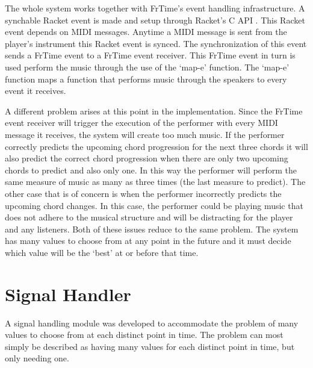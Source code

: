 \documentclass[12pt]{ucthesis}
\begin{document}
The whole system works together with FrTime's event handling infrastructure. A synchable Racket event is made and setup through Racket's C API . This Racket event depends on MIDI messages. Anytime a MIDI message is sent from the player's instrument this Racket event is synced. The synchronization of this event sends a FrTime event to a FrTime event receiver. This FrTime event in turn is used perform the music through the use of the `map-e' function. The `map-e' function maps a function that performs music through the speakers to every event it receives. 


A different problem arises at this point in the implementation. Since the FrTime event receiver will trigger the execution of the performer with every MIDI message it receives, the system will create too much music. If the performer correctly predicts the upcoming chord progression for the next three chords it will also predict the correct chord progression when there are only two upcoming chords to predict and also only one. In this way the performer will perform the same measure of music as many as three times (the last measure to predict). The other case that is of concern is when the performer incorrectly predicts the upcoming chord changes. In this case, the performer could be playing music that does not adhere to the musical structure and will be distracting for the player and any listeners. Both of these issues reduce to the same problem. The system has many values to choose from at any point in the future and it must decide which value will be the `best' at or before that time.


\section{Signal Handler}
\label {signal-handler}

A signal handling module was developed to accommodate the problem of many values to choose from at each distinct point in time. The problem can most simply be described as having many values for each distinct point in time, but only needing one. 
\end{document}

